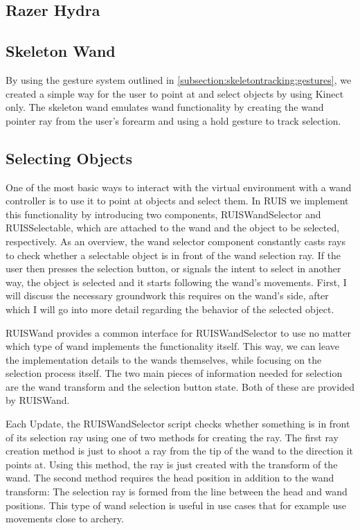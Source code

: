 \documentclass[12pt,a4paper,oneside,pdftex]{report}
\begin{document}
\subsection{Razer Hydra}
\label{subsection:wandcontrollers:hydra}

\subsection{Skeleton Wand}
\label{subsection:wandcontrollers:skeleton}

By using the gesture system outlined in \ref{subsection:skeletontracking:gestures}, we created a simple way for the user to point at and select objects by using Kinect only. The skeleton wand emulates wand functionality by creating the wand pointer ray from the user's forearm and using a hold gesture to track selection. 

\subsection{Selecting Objects}
\label{subsection:wandcontrollers:selection}

One of the most basic ways to interact with the virtual environment with a wand controller is to use it to point at objects and select them. In RUIS we implement this functionality by introducing two components, RUISWandSelector and RUISSelectable, which are attached to the wand and the object to be selected, respectively. As an overview, the wand selector component constantly casts rays to check whether a selectable object is in front of the wand selection ray. If the user then presses the selection button, or signals the intent to select in another way, the object is selected and it starts following the wand's movements. First, I will discuss the necessary groundwork this requires on the wand's side, after which I will go into more detail regarding the behavior of the selected object.

RUISWand provides a common interface for RUISWandSelector to use no matter which type of wand implements the functionality itself. This way, we can leave the implementation details to the wands themselves, while focusing on the selection process itself. The two main pieces of information needed for selection are the wand transform and the selection button state. Both of these are provided by RUISWand.

Each Update, the RUISWandSelector script checks whether something is in front of its selection ray using one of two methods for creating the ray. The first ray creation method is just to shoot a ray from the tip of the wand to the direction it points at. Using this method, the ray is just created with the transform of the wand. The second method requires the head position in addition to the wand transform: The selection ray is formed from the line between the head and wand positions. This type of wand selection is useful in use cases that for example use movements close to archery.
\end{document}
